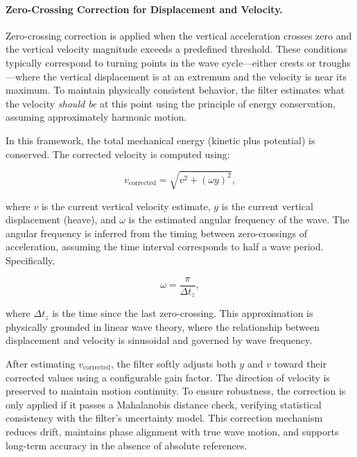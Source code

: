 \documentclass[11pt,letterpaper]{article}
\begin{document}
\paragraph{Zero-Crossing Correction for Displacement and Velocity.}
Zero-crossing correction is applied when the vertical acceleration crosses zero and the vertical velocity magnitude exceeds a predefined threshold. These conditions typically correspond to turning points in the wave cycle—either crests or troughs—where the vertical displacement is at an extremum and the velocity is near its maximum. To maintain physically consistent behavior, the filter estimates what the velocity \emph{should be} at this point using the principle of energy conservation, assuming approximately harmonic motion.

In this framework, the total mechanical energy (kinetic plus potential) is conserved. The corrected velocity is computed using:

\begin{equation}
v_{\text{corrected}} = \sqrt{v^2 + (\omega y)^2},
\end{equation}

where \( v \) is the current vertical velocity estimate, \( y \) is the current vertical displacement (heave), and \( \omega \) is the estimated angular frequency of the wave. The angular frequency is inferred from the timing between zero-crossings of acceleration, assuming the time interval corresponds to half a wave period. Specifically,

\begin{equation}
\omega = \frac{\pi}{\Delta t_{z}},
\end{equation}

where \( \Delta t_{z} \) is the time since the last zero-crossing. This approximation is physically grounded in linear wave theory, where the relationship between displacement and velocity is sinusoidal and governed by wave frequency.

After estimating \( v_{\text{corrected}} \), the filter softly adjusts both \( y \) and \( v \) toward their corrected values using a configurable gain factor. The direction of velocity is preserved to maintain motion continuity. To ensure robustness, the correction is only applied if it passes a Mahalanobis distance check, verifying statistical consistency with the filter's uncertainty model. This correction mechanism reduces drift, maintains phase alignment with true wave motion, and supports long-term accuracy in the absence of absolute references.
\end{document}
